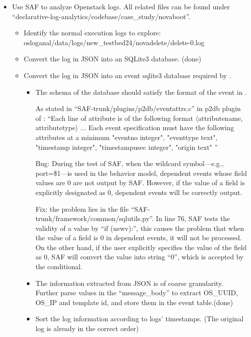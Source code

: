 \documentclass{article}
\begin{document}
\begin{itemize}
\item Use SAF to analyze Openstack logs. All related files can be found under
  ``declarative-log-analytics/codebase/case_study/novaboot''.
  \begin{itemize}
  \item Identify the normal execution logs to explore: osloganal/data/logs/new\_testbed24/novadelete/delete-0.log
  \item Convert the log in JSON into an SQLite3 database. (done)
  \item Convert the log in JSON into an event sqlite3 database required by \saf{}.
    \begin{itemize}
    \item The schema of the database should satisfy the format of the event in
      \saf{}.
      
      As stated in ``SAF-trunk/plugins/p2db/eventattrs.c'' in p2db plugin of \saf{}: ``Each line of
      attribute is of the following format $\langle$attributename,
      attributetype$\rangle$ ... Each event specification must have the
      following attributes at a minimum "eventno integer", "eventtype text",
      "timestamp integer",	"timestampusec integer", "origin text" ''

      Bug: During the test of SAF, when the wildcard symbol---e.g.,
      port=\$1---is used in the behavior model, dependent events
      whose field values are 0 are not output by SAF. However, if the value of a
      field is explicitly designated as 0, dependent events will be correctly
      output.

      Fix: the problem lies in the file
      ``SAF-trunk/framework/common/sqlutils.py''. In line 76, SAF tests the
      validity of a value by ``if (newv):'', this causes the problem that when
      the value of a field is 0 in dependent events, it will not be
      processed. On the other hand, if the user explicitly specifies the value
      of the field as 0, SAF will convert the value into string ``0'', which
      is accepted by the conditional.
    \item The information extracted from JSON is of coarse granularity. Further
      parse values in the ``message\_body'' to extract OS\_UUID, OS\_IP and
      template id, and store them in the event table.(done)
      
    \item Sort the log information according to logs' timestamps. (The original
      log is already in the correct order)
    \end{itemize}


\end{itemize}
\end{itemize}
\end{document}
